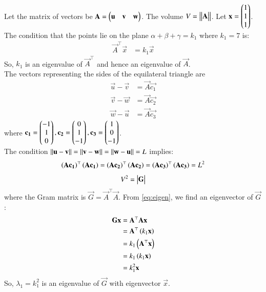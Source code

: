 \documentclass[journal]{IEEEtran}
\begin{document}
Let the matrix of vectors be $\mathbf{A} = \begin{pmatrix}\mathbf{u} & \mathbf{v} & \mathbf{w}\end{pmatrix}$. The volume $V = \left\vert\begin{vmatrix}\mathbf{A}\end{vmatrix}\right\vert$.
Let $\mathbf{x} = \begin{pmatrix}1 \\ 1 \\ 1\end{pmatrix}$. The condition that the points lie on the plane $\alpha+\beta+\gamma=k_1$ where $k_1=7$ is:
\begin{align}
    \vec{A}^\top\vec{x} &= k_1\vec{x} \label{eq:eigen}
\end{align}
So, $k_1$ is an eigenvalue of $\vec{A}^\top$ and hence an eigenvalue of $\vec{A}$. \\
The vectors representing the sides of the equilateral triangle are
\begin{align}
    \vec{u} - \vec{v} &= \vec{A}\vec{c_1} \label{eq:1} \\
    \vec{v} - \vec{w} &= \vec{A}\vec{c_2} \label{eq:2} \\
    \vec{w} - \vec{u} &= \vec{A}\vec{c_3} \label{eq:3}
\end{align}
where $\mathbf{c_1} = \begin{pmatrix}-1 \\ 1 \\ 0\end{pmatrix}, \mathbf{c_2} = \begin{pmatrix}0 \\ 1 \\ -1\end{pmatrix}, \mathbf{c_3} = \begin{pmatrix}1 \\ 0 \\ -1\end{pmatrix}$. \\
The condition $\left\lVert\mathbf{u} - \mathbf{v}\right\rVert = \left\lVert\mathbf{v} - \mathbf{w}\right\rVert = \left\lVert\mathbf{w} - \mathbf{u}\right\rVert = L$ implies:
\begin{align}
    \left(\mathbf{A}\mathbf{c_1}\right)^\top\left(\mathbf{A}\mathbf{c_1}\right) = \left(\mathbf{A}\mathbf{c_2}\right)^\top\left(\mathbf{A}\mathbf{c_2}\right) = \left(\mathbf{A}\mathbf{c_3}\right)^\top\left(\mathbf{A}\mathbf{c_3}\right) = L^2 \label{eq:gram}
\end{align}
\begin{align}
    V^2 = \begin{vmatrix}\mathbf{G}\end{vmatrix} 
\end{align}
where the Gram matrix is $\vec{G} = \vec{A}^\top\vec{A}$. From \eqref{eq:eigen}, we find an eigenvector of $\vec{G}$:
\begin{align}
    \mathbf{G}\mathbf{x} &= \mathbf{A}^\top\mathbf{A}\mathbf{x} \\
    &= \mathbf{A}^\top\left(k_1\mathbf{x}\right) \\
    &= k_1\left(\mathbf{A}^\top\mathbf{x}\right) \\
    &= k_1\left(k_1\mathbf{x}\right) \\
    &= k_1^2\mathbf{x}
\end{align}
So, $\lambda_1 = k_1^2$ is an eigenvalue of $\vec{G}$ with eigenvector $\vec{x}$. \\
\end{document}
